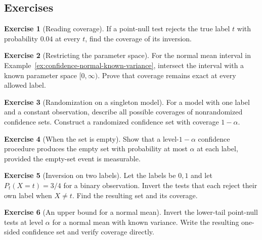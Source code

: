 \documentclass[11pt,oneside]{book}
\theoremstyle{definition}
\newtheorem{exercise}{Exercise}[section]
\theoremstyle{remark}
\begin{document}
\subsection{Exercises}
\label{subsec:exercises-6-3}

\begin{exercise}[Reading coverage]
\label{exer:coverage-from-acceptance}
If a point-null test rejects the true label $t$ with probability
$0.04$ at every $t$, find the coverage of its inversion.
\end{exercise}

\begin{exercise}[Restricting the parameter space]
\label{exer:confidence-restricted-parameter}
For the normal mean interval in Example~\ref{ex:confidence-normal-known-variance},
intersect the interval with a known parameter space $[0,\infty)$.
Prove that coverage remains exact at every allowed label.
\end{exercise}

\begin{exercise}[Randomization on a singleton model]
\label{exer:confidence-singleton-randomization}
For a model with one label and a constant observation, describe
all possible coverages of nonrandomized confidence sets. Construct
a randomized confidence set with coverage $1-\alpha$.
\end{exercise}

\begin{exercise}[When the set is empty]
\label{exer:confidence-empty-set-bound}
Show that a level-$1-\alpha$ confidence procedure produces the
empty set with probability at most $\alpha$ at each label,
provided the empty-set event is measurable.
\end{exercise}

\begin{exercise}[Inversion on two labels]
\label{exer:confidence-two-label-inversion}
Let the labels be $0,1$ and let $P_t(X=t)=3/4$ for a binary
observation. Invert the tests that each reject their own label
when $X\ne t$. Find the resulting set and its coverage.
\end{exercise}

\begin{exercise}[An upper bound for a normal mean]
\label{exer:confidence-normal-upper-bound}
Invert the lower-tail point-null tests at level $\alpha$ for
a normal mean with known variance. Write the resulting
one-sided confidence set and verify coverage directly.
\end{exercise}
\end{document}
